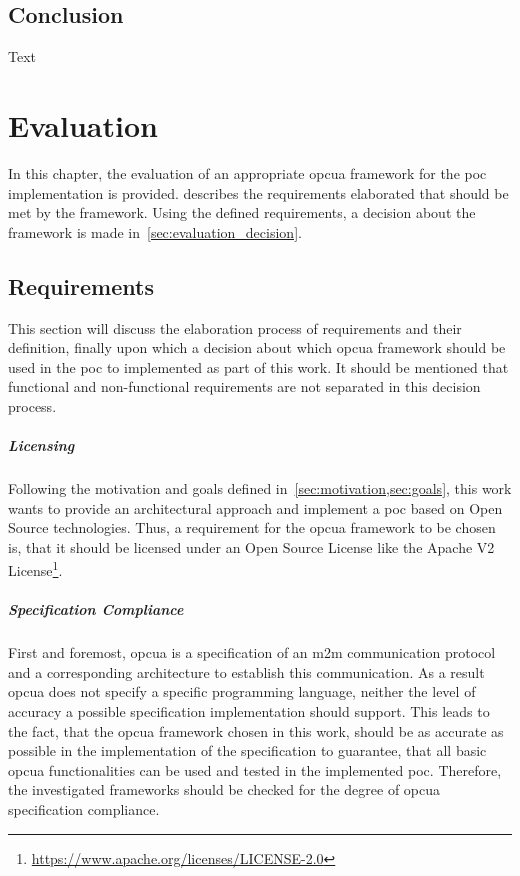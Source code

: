 \documentclass[
a4paper,
twoside,
headsepline,
cleardoublepage=empty,
parskip=half,
draft=false
]{scrbook}
\begin{document}
		\section*{Conclusion}\label{sec:state_of_the_research_conclusion}
		
			Text
			
	\chapter{Evaluation}\label{ch:evaluation}
	
		In this chapter, the evaluation of an appropriate \gls{opcua} framework for the \gls{poc} implementation is provided.  describes the requirements elaborated that should be met by the framework. 
		Using the defined requirements, a decision about the framework is made in~\cref{sec:evaluation_decision}.
		
		\section{Requirements}\label{sec:evaluation_requirements}
		
			This section will discuss the elaboration process of requirements and their definition, finally upon which a decision about which \gls{opcua} framework should be used in the \gls{poc} to implemented as part of this work. 
			It should be mentioned that functional and non-functional requirements are not separated in this decision process.
			
			\paragraph{Licensing} Following the motivation and goals defined in~\cref{sec:motivation,sec:goals}, this work wants to provide an architectural approach and implement a \gls{poc} based on Open Source technologies.
			Thus, a requirement for the \gls{opcua} framework to be chosen is, that it should be licensed under an Open Source License like the Apache V2 License\footnote{\url{https://www.apache.org/licenses/LICENSE-2.0}}.
			
			\paragraph{Specification Compliance} First and foremost, \gls{opcua} is a specification of an \gls{m2m} communication protocol and a corresponding architecture to establish this communication. 
			As a result \gls{opcua} does not specify a specific programming language, neither the level of accuracy a possible specification implementation should support. 
			This leads to the fact, that the \gls{opcua} framework chosen in this work, should be as accurate as possible in the implementation of the specification to guarantee, that all basic \gls{opcua} functionalities can be used and tested in the implemented \gls{poc}. 
			Therefore, the investigated frameworks should be checked for the degree of \gls{opcua} specification compliance.
			
\end{document}
